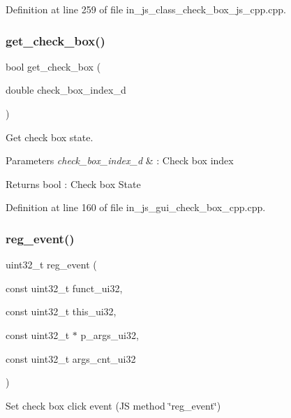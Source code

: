 Definition at line 259 of file in\+\_\+js\+\_\+class\+\_\+check\+\_\+box\+\_\+js\+\_\+cpp.\+cpp.

\mbox{\label{group___check__box_gad1d9ca4bee81891c90cb42d1c66402c8}} 
\subsubsection{get\_check\_box()}
{\footnotesize\ttfamily bool get\+\_\+check\+\_\+box (\begin{DoxyParamCaption}\item[{double}]{check\+\_\+box\+\_\+index\+\_\+d }\end{DoxyParamCaption})}



Get check box state. 


\begin{DoxyParams}{Parameters}
{\em check\+\_\+box\+\_\+index\+\_\+d} & \+: Check box index \\
\hline
\end{DoxyParams}
\begin{DoxyReturn}{Returns}
bool \+: Check box State 
\end{DoxyReturn}


Definition at line 160 of file in\+\_\+js\+\_\+gui\+\_\+check\+\_\+box\+\_\+cpp.\+cpp.

\mbox{\label{group___check__box_gaec005a4f579a1a6d57a16392e5cdd07e}} 
\subsubsection{reg\_event()}
{\footnotesize\ttfamily uint32\+\_\+t reg\+\_\+event (\begin{DoxyParamCaption}\item[{const uint32\+\_\+t}]{funct\+\_\+ui32,  }\item[{const uint32\+\_\+t}]{this\+\_\+ui32,  }\item[{const uint32\+\_\+t $\ast$}]{p\+\_\+args\+\_\+ui32,  }\item[{const uint32\+\_\+t}]{args\+\_\+cnt\+\_\+ui32 }\end{DoxyParamCaption})\hspace{0.3cm}{\ttfamily [static]}}



Set check box click event (JS method \char`\"{}reg\+\_\+event\char`\"{}) 


